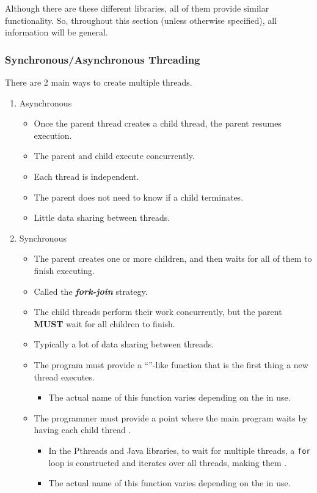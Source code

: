 Although there are these different libraries, all of them provide similar functionality.
So, throughout this section (unless otherwise specified), all information will be general.

\subsubsection{Synchronous/Asynchronous Threading}\label{subsubsec:Sync_Async_Threading}
There are 2 main ways to create multiple threads.
\begin{enumerate}[noitemsep]
\item Asynchronous
  \begin{itemize}[noitemsep]
  \item Once the parent thread creates a child thread, the parent resumes execution.
  \item The parent and child execute concurrently.
  \item Each thread is independent.
  \item The parent does not need to know if a child terminates.
  \item Little data sharing between threads.
  \end{itemize}
\item Synchronous
  \begin{itemize}[noitemsep]
  \item The parent creates one or more children, and then waits for all of them to finish executing.
  \item Called the \textbf{\emph{fork-join}} strategy.
  \item The child threads perform their work concurrently, but the parent \textbf{MUST} wait for all children to finish.
  \item Typically a lot of data sharing between threads.
  \item The program must provide a ``''-like function that is the first thing a new thread executes.
    \begin{itemize}[noitemsep]
    \item The actual name of this function varies depending on the  in use.
    \end{itemize}
  \item The programmer must provide a point where the main program waits by having each child thread .
    \begin{itemize}[noitemsep]
    \item In the Pthreads and Java libraries, to wait for multiple threads, a \texttt{for} loop is constructed and iterates over all threads, making them .
    \item The actual name of this function varies depending on the  in use.
    \end{itemize}
  \end{itemize}
\end{enumerate}

